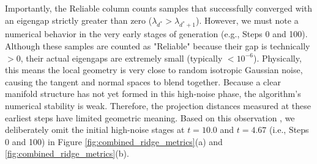 \documentclass[11pt]{article}
\begin{document}
Importantly, the Reliable column counts samples that successfully converged with an eigengap strictly greater than zero ($\lambda_{d^*} > \lambda_{d^*+1}$). However, we must note a numerical behavior in the very early stages of generation (e.g., Steps 0 and 100). Although these samples are counted as "Reliable" because their gap is technically $> 0$, their actual eigengaps are extremely small (typically $< 10^{-6}$). Physically, this means the local geometry is very close to random isotropic Gaussian noise, causing the tangent and normal spaces to blend together. Because a clear manifold structure has not yet formed in this high-noise phase, the algorithm's numerical stability is weak. Therefore, the projection distances measured at these earliest steps have limited geometric meaning. Based on this observation , we deliberately omit the initial high-noise stages at $t=10.0$ and $t=4.67$ (i.e., Steps 0 and 100) in Figure \ref{fig:combined_ridge_metrics}(a) and \ref{fig:combined_ridge_metrics}(b).
\end{document}
